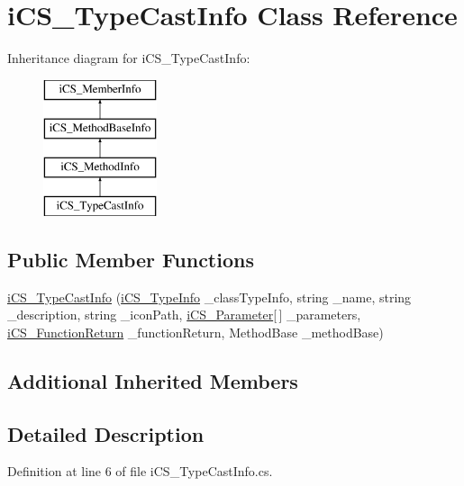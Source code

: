 \hypertarget{classi_c_s___type_cast_info}{\section{i\+C\+S\+\_\+\+Type\+Cast\+Info Class Reference}
\label{classi_c_s___type_cast_info}
}
Inheritance diagram for i\+C\+S\+\_\+\+Type\+Cast\+Info\+:\begin{figure}[H]
\begin{center}
\leavevmode
\includegraphics[height=4.000000cm]{classi_c_s___type_cast_info}
\end{center}
\end{figure}
\subsection*{Public Member Functions}
\begin{DoxyCompactItemize}
\item 
\hyperlink{classi_c_s___type_cast_info_a8dc8831f40534a735186b450303e44c7}{i\+C\+S\+\_\+\+Type\+Cast\+Info} (\hyperlink{classi_c_s___type_info}{i\+C\+S\+\_\+\+Type\+Info} \+\_\+class\+Type\+Info, string \+\_\+name, string \+\_\+description, string \+\_\+icon\+Path, \hyperlink{classi_c_s___parameter}{i\+C\+S\+\_\+\+Parameter}\mbox{[}$\,$\mbox{]} \+\_\+parameters, \hyperlink{classi_c_s___function_return}{i\+C\+S\+\_\+\+Function\+Return} \+\_\+function\+Return, Method\+Base \+\_\+method\+Base)
\end{DoxyCompactItemize}
\subsection*{Additional Inherited Members}


\subsection{Detailed Description}


Definition at line 6 of file i\+C\+S\+\_\+\+Type\+Cast\+Info.\+cs.



